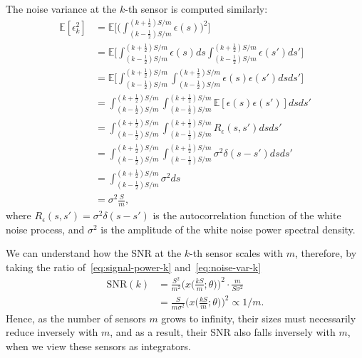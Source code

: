 \documentclass[conference,letterpaper]{IEEEtran}
\begin{document}
The noise variance at the $k$-th sensor is computed similarly:
\begin{align}
	\mathbb E[\epsilon_k^2] &= \mathbb E \Bigg[ \bigg(\int_{(k-\frac{1}{2})S/m}^{(k+\frac{1}{2})S/m} \epsilon(s)\bigg)^2 \Bigg] \\
	&= \mathbb E \Bigg[ \int_{(k-\frac{1}{2})S/m}^{(k+\frac{1}{2})S/m} \epsilon(s) ds \int_{(k-\frac{1}{2})S/m}^{(k+\frac{1}{2})S/m} \epsilon(s') ds' \Bigg] \\
	&= \mathbb E \Bigg[ \int_{(k-\frac{1}{2})S/m}^{(k+\frac{1}{2})S/m} \int_{(k-\frac{1}{2})S/m}^{(k+\frac{1}{2})S/m} \epsilon(s) \epsilon(s') ds ds' \Bigg] \\
	&= \int_{(k-\frac{1}{2})S/m}^{(k+\frac{1}{2})S/m} \int_{(k-\frac{1}{2})S/m}^{(k+\frac{1}{2})S/m} \mathbb E[\epsilon(s) \epsilon(s')] ds ds' \\
	&= \int_{(k-\frac{1}{2})S/m}^{(k+\frac{1}{2})S/m} \int_{(k-\frac{1}{2})S/m}^{(k+\frac{1}{2})S/m} R_\epsilon(s, s') ds ds' \\
	&= \int_{(k-\frac{1}{2})S/m}^{(k+\frac{1}{2})S/m} \int_{(k-\frac{1}{2})S/m}^{(k+\frac{1}{2})S/m} \sigma^2 \delta(s - s') ds ds' \\
	&= \int_{(k-\frac{1}{2})S/m}^{(k+\frac{1}{2})S/m} \sigma^2 ds \\
	&= \sigma^2 \frac{S}{m}, \label{eq:noise-var-k}
\end{align}
where $R_\epsilon(s, s') = \sigma^2 \delta(s - s')$ is the autocorrelation
function of the white noise process, and $\sigma^2$ is the amplitude of the
white noise power spectral density.

We can understand how the SNR at the $k$-th sensor scales with $m$, therefore,
by taking the ratio of~\eqref{eq:signal-power-k} and~\eqref{eq:noise-var-k}
\begin{align}
	\text{SNR}(k) &= \frac{S^2}{m^2} \bigg(x\Big(\frac{kS}{m}; \theta\Big)\bigg)^2 \cdot \frac{m}{S\sigma^2} \\
	&= \frac{S}{m\sigma^2} \bigg(x\Big(\frac{kS}{m}; \theta\Big)\bigg)^2 \propto 1/m.
\end{align}
Hence, as the number of sensors $m$ grows to infinity, their sizes must
necessarily reduce inversely with $m$, and as a result, their SNR also falls
inversely with $m$, when we view these sensors as integrators.
\end{document}
